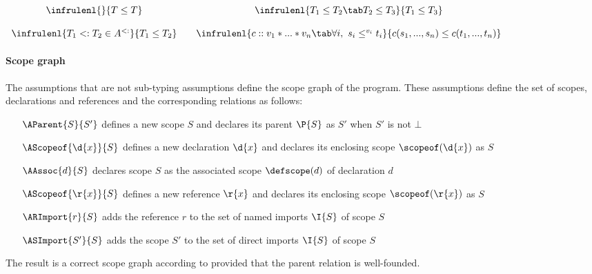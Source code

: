 \begin{center}$
\begin{array}{ccc}
 \infrulenl{}{T \leq T} & & \infrulenl{T_1 \leq T_2 \tab T_2 \leq T_3  }{T_1 \leq T_3}\bigskip\\
 \infrulenl{T_1 <: T_2 \in A^{<:}}{T_1 \leq T_2} & & 
 \infrulenl{c :: v_1*...*v_n\tab \forall i,\ s_i \leq^{v_i} t_i }{c(s_1,...,s_n)
 \leq c(t_1,...,t_n)} \end{array}$
\end{center}


\paragraph{Scope graph} 

The assumptions that are not sub-typing assumptions define the scope graph of
the program. These assumptions define the set of scopes, declarations and
references and the corresponding relations as follows:

\begin{itemize}[leftmargin=2cm]
 \item[$\AParent{S}{S'}$] defines a new scope $S$ and declares its parent
 $\P{S}$ as $S'$ when  $S'$ is not $\bot$
 \item[$\AScopeof{\d{x}}{S}$] defines a new declaration $\d{x}$ and declares its
 enclosing scope $\scopeof(\d{x})$ as $S$
 \item[$\AAssoc{d}{S}$] declares scope $S$ as the associated scope
 $\defscope(d)$ of  declaration $d$
 \item[$\AScopeof{\r{x}}{S}$] defines a new reference $\r{x}$ and declares its
 enclosing  scope $\scopeof(\r{x})$ as $S$
 \item[$\ARImport{r}{S}$] adds the reference $r$ to the set of named imports
 $\I{S}$ of  scope $S$
 \item[$\ASImport{S'}{S}$] adds the scope $S'$ to the set of direct imports
 $\I{S}$ of  scope $S$
\end{itemize}

\noindent
The result is a correct scope graph according to 
provided that the parent relation is well-founded.


